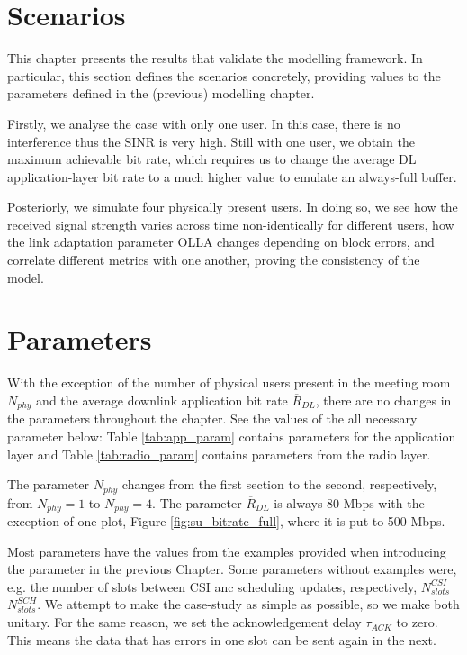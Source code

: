 \section{Scenarios}
\label{sec:scenarios}

This chapter presents the results that validate the modelling framework. In particular, this section defines the scenarios concretely, providing values to the parameters defined in the (previous) modelling chapter. 

Firstly, we analyse the case with only one user. In this case, there is no interference thus the \acs{SINR} is very high. Still with one user, we obtain the maximum achievable bit rate, which requires us to change the average DL application-layer bit rate to a much higher value to emulate an always-full buffer. 

Posteriorly, we simulate four physically present users. In doing so, we see how the received signal strength varies across time non-identically for different users, how the link adaptation parameter \acs{OLLA} changes depending on block errors, and correlate different metrics with one another, proving the consistency of the model.

\section*{Parameters}

With the exception of the number of physical users present in the meeting room $N_{phy}$ and the average downlink application bit rate $\overline{R}_{DL}$, there are no changes in the parameters throughout the chapter. See the values of the all necessary parameter below: Table \ref{tab:app_param} contains parameters for the application layer and Table \ref{tab:radio_param} contains parameters from the radio layer. 

The parameter $N_{phy}$ changes from the first section to the second, respectively, from $N_{phy} = 1$ to $N_{phy} = 4$. The parameter $\overline{R}_{DL}$ is always 80 Mbps with the exception of one plot, Figure \ref{fig:su_bitrate_full}, where it is put to 500 Mbps. 

Most parameters have the values from the examples provided when introducing the parameter in the previous Chapter. Some parameters without examples were, e.g. the number of slots between CSI anc scheduling updates, respectively, $N_{slots}^{CSI}$ $N_{slots}^{SCH}$. We attempt to make the case-study as simple as possible, so we make both unitary. For the same reason, we set the acknowledgement delay $\tau_{ACK}$ to zero. This means the data that has errors in one slot can be sent again in the next. 

